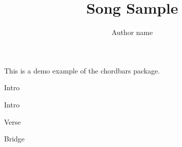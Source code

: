\documentclass[11pt]{article}
\title{Song Sample}
\author{Author name}
\begin{document}
\maketitle

This is a demo example of the chordbars package.

\begin{chordbar}{4}{1}{Intro}
\end{chordbar}

\begin{chordbar}{4}{1}{Intro}
\end{chordbar}


\begin{chordbar}{8}{2}{Verse}
\end{chordbar}

\begin{chordbar}{8}{1}{Bridge}
\end{chordbar}
\end{document}
